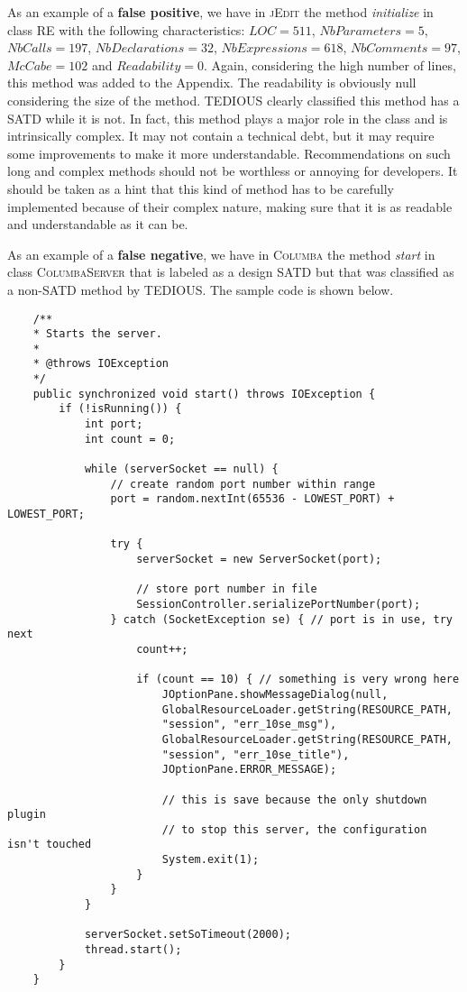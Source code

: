 As an example of a \textbf{false positive}, we have in \textsc{jEdit} the method \textit{initialize} in class \textsc{RE} with the following characteristics: $LOC=511$, $NbParameters=5$, $NbCalls=197$, $NbDeclarations=32$, $NbExpressions=618$, $NbComments=97$, $McCabe=102$ and $Readability=0$. Again, considering the high number of lines, this method was added to the Appendix. The readability is obviously null considering the size of the method. TEDIOUS clearly classified this method has a SATD while it is not. In fact, this method plays a major role in the class and is intrinsically complex. It may not contain a technical debt, but it may require some improvements to make it more understandable. Recommendations on such long and complex methods should not be worthless or annoying for developers. It should be taken as a hint that this kind of method has to be carefully implemented because of their complex nature, making sure that it is as readable and understandable as it can be. 

As an example of a \textbf{false negative}, we have in \textsc{Columba} the method \textit{start} in class \textsc{ColumbaServer} that is labeled as a design SATD but that was classified as a non-SATD method by TEDIOUS. The sample code is shown below.

\begin{mdframed}
	\begin{lstlisting}
	/**
	* Starts the server.
	* 
	* @throws IOException
	*/
	public synchronized void start() throws IOException {
		if (!isRunning()) {
			int port;
			int count = 0;
	
			while (serverSocket == null) {
				// create random port number within range
				port = random.nextInt(65536 - LOWEST_PORT) + LOWEST_PORT;
	
				try {
					serverSocket = new ServerSocket(port);
	
					// store port number in file
					SessionController.serializePortNumber(port);
				} catch (SocketException se) { // port is in use, try next
					count++;
	
					if (count == 10) { // something is very wrong here
						JOptionPane.showMessageDialog(null,
						GlobalResourceLoader.getString(RESOURCE_PATH,
						"session", "err_10se_msg"),
						GlobalResourceLoader.getString(RESOURCE_PATH,
						"session", "err_10se_title"),
						JOptionPane.ERROR_MESSAGE);
	
						// this is save because the only shutdown plugin
						// to stop this server, the configuration isn't touched
						System.exit(1);
					}
				}
			}
	
			serverSocket.setSoTimeout(2000);
			thread.start();
		}
	}
	\end{lstlisting}
\end{mdframed}

